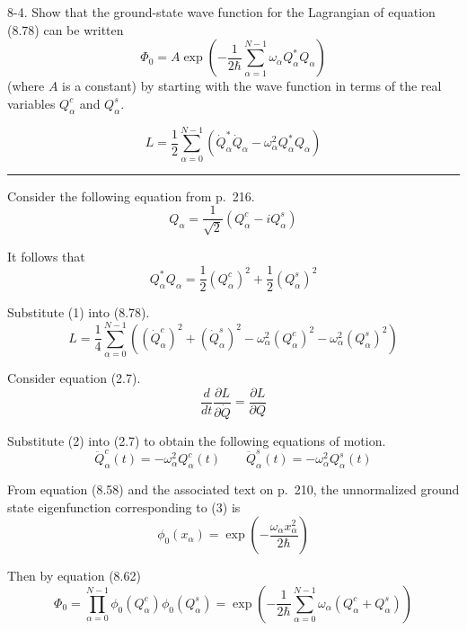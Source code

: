 \documentclass[12pt]{article}
\begin{document}
8-4.
Show that the ground-state wave function for the Lagrangian of
equation (8.78) can be written
\begin{equation*}
\Phi_0=A\exp\left(
-\frac{1}{2\hbar}
\sum_{\alpha=1}^{N-1}
\omega_\alpha Q_\alpha^*Q_\alpha
\right)
\tag{8.83}
\end{equation*}
(where $A$ is a constant) by starting with the wave function in terms of
the real variables $Q_\alpha^c$ and $Q_\alpha^s$.

\begin{equation*}
L=\frac{1}{2}\sum_{\alpha=0}^{N-1}
\left(\dot Q_\alpha^*\dot Q_\alpha-\omega_\alpha^2Q_\alpha^*Q_\alpha\right)
\tag{8.78}
\end{equation*}

\bigskip
\hrule

\bigskip
Consider the following equation from p.~216.
\begin{equation*}
Q_\alpha=\frac{1}{\sqrt2}(Q_\alpha^c-iQ_\alpha^s)
\end{equation*}

It follows that
\begin{equation*}
Q_\alpha^*Q_\alpha
=\frac{1}{2}(Q_\alpha^c)^2+\frac{1}{2}(Q_\alpha^s)^2
\tag{1}
\end{equation*}

Substitute (1) into (8.78).
\begin{equation*}
L=\frac{1}{4}\sum_{\alpha=0}^{N-1}
\left(
(\dot Q_\alpha^c)^2
+(\dot Q_\alpha^s)^2
-\omega_\alpha^2(Q_\alpha^c)^2
-\omega_\alpha^2(Q_\alpha^s)^2
\right)
\tag{2}
\end{equation*}

Consider equation (2.7).
\begin{equation*}
\frac{d}{dt}\frac{\partial L}{\partial\dot Q}=\frac{\partial L}{\partial Q}
\tag{2.7}
\end{equation*}

Substitute (2) into (2.7) to obtain the following equations of motion.
\begin{equation*}
\ddot Q_\alpha^c(t)=-\omega_\alpha^2Q_\alpha^c(t)
\qquad
\ddot Q_\alpha^s(t)=-\omega_\alpha^2Q_\alpha^s(t)
\tag{3}
\end{equation*}

From equation (8.58) and the associated text on p.~210,
the unnormalized ground state eigenfunction corresponding to (3) is
\begin{equation*}
\phi_0(x_\alpha)=\exp\left(-\frac{\omega_\alpha x_\alpha^2}{2\hbar}\right)
\end{equation*}

Then by equation (8.62)
\begin{equation*}
\Phi_0=\prod_{\alpha=0}^{N-1}\phi_0(Q_\alpha^c)\phi_0(Q_\alpha^s)
=\exp\left(-\frac{1}{2\hbar}\sum_{\alpha=0}^{N-1}\omega_\alpha(Q_\alpha^c+Q_\alpha^s)\right)
\end{equation*}
\end{document}
